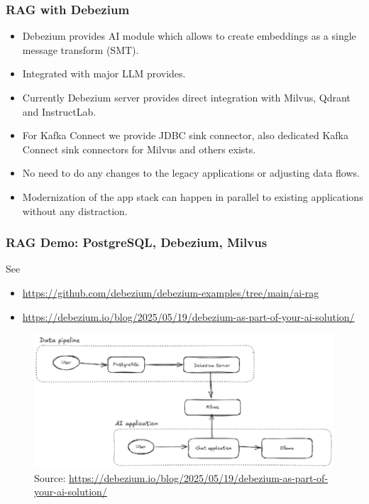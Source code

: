 \documentclass[10pt,utf8]{beamer}
\begin{document}
\begin{frame}
     \frametitle{RAG with Debezium}
     \begin{itemize}
        \item Debezium provides AI module which allows to create embeddings as a single message transform (SMT).
        \item Integrated with major LLM provides.
        \item Currently Debezium server provides direct integration with Milvus, Qdrant and InstructLab.
        \item For Kafka Connect we provide JDBC sink connector, also dedicated Kafka Connect sink connectors for Milvus and others exists.
        \item No need to do any changes to the legacy applications or adjusting data flows.
        \item Modernization of the app stack can happen in parallel to existing applications without any distraction.
     \end{itemize}
\end{frame}

\begin{frame}
    \frametitle{RAG Demo: PostgreSQL, Debezium, Milvus}
    See
    \begin{itemize}
        \color{blue} \footnotesize
        \item \url{https://github.com/debezium/debezium-examples/tree/main/ai-rag}
        \item \url{https://debezium.io/blog/2025/05/19/debezium-as-part-of-your-ai-solution/}
        \color{black}
    \end{itemize}
    \begin{figure}
        \centering
        \includegraphics[height=5cm]{./img/dbz_milvus_demo.eps}
        \caption{\tiny{Source: \url{https://debezium.io/blog/2025/05/19/debezium-as-part-of-your-ai-solution/}}}
    \end{figure}
\end{frame}
\end{document}
